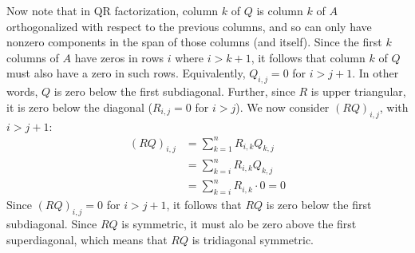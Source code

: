 \documentclass{article}
\begin{document}
Now note that in QR factorization, column $k$ of $Q$ is column $k$ of $A$ orthogonalized with respect to the previous columns, and so can only have nonzero components in the span of those columns (and itself). Since the first $k$ columns of $A$ have zeros in rows $i$ where $i > k + 1$, it follows that column $k$ of $Q$ must also have a zero in such rows. Equivalently, $Q_{i,j} = 0$ for $i > j + 1$. In other words, $Q$ is zero below the first subdiagonal. Further, since $R$ is upper triangular, it is zero below the diagonal ($R_{i,j} = 0$ for $i > j$). We now consider $(RQ)_{i,j}$, with $i > j + 1$:
\begin{align*}
    (RQ)_{i,j} & = \sum_{k=1}^n R_{i,k}Q_{k,j} \\
    & = \sum_{k=i}^n R_{i,k}Q_{k,j} \\
    & = \sum_{k=i}^n R_{i,k} \cdot 0 = 0
\end{align*}
Since $(RQ)_{i,j} = 0$ for $i > j + 1$, it follows that $RQ$ is zero below the first subdiagonal. Since $RQ$ is symmetric, it must alo be zero above the first superdiagonal, which means that $RQ$ is tridiagonal symmetric.
\end{document}
